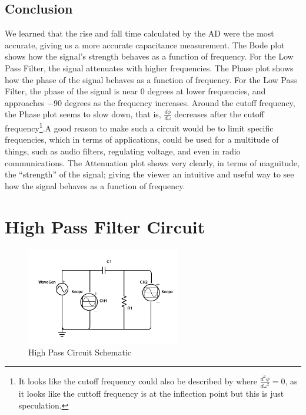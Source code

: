 \documentclass{article}
\begin{document}
\subsection{Conclusion}
We learned that the rise and fall time calculated by the AD were the most accurate, giving us a more accurate capacitance measurement. The Bode plot shows how the signal's strength behaves as a function of frequency. For the Low Pass Filter, the signal attenuates with higher frequencies. The Phase plot shows how the phase of the signal behaves as a function of frequency. For the Low Pass Filter, the phase of the signal is near 0 degrees at lower frequencies, and approaches $-$90 degrees as the frequency increases. Around the cutoff frequency, the Phase plot seems to slow down, that is, $\frac{d\phi}{d\omega}$ decreases after the cutoff frequency\footnote{It looks like the cutoff frequency could also be described by where $\frac{d^2\phi}{d\omega^2} = 0$, as it looks like the cuttoff frequency is at the inflection point but this is just speculation.}.A good reason to make such a circuit would be to limit specific frequencies, which in terms of applications, could be used for a multitude of things, such as audio filters, regulating voltage, and even in radio communications. The Attenuation plot shows very clearly, in terms of magnitude, the ``strength'' of the signal; giving the viewer an intuitive and useful way to see how the signal behaves as a function of frequency. 
\vspace{-3mm}
\section{High Pass Filter Circuit}
\begin{figure}\vspace{-9mm}
    \centering
    \includegraphics[width=0.6\textwidth]{Images/Scheme-it-export-PHYS-605-L3A2-High-Pass-2024-03-03-23-32.png}
    \caption{High Pass Circuit Schematic}
    \label{fig:High Pass Circuit}
\end{figure}
\end{document}
